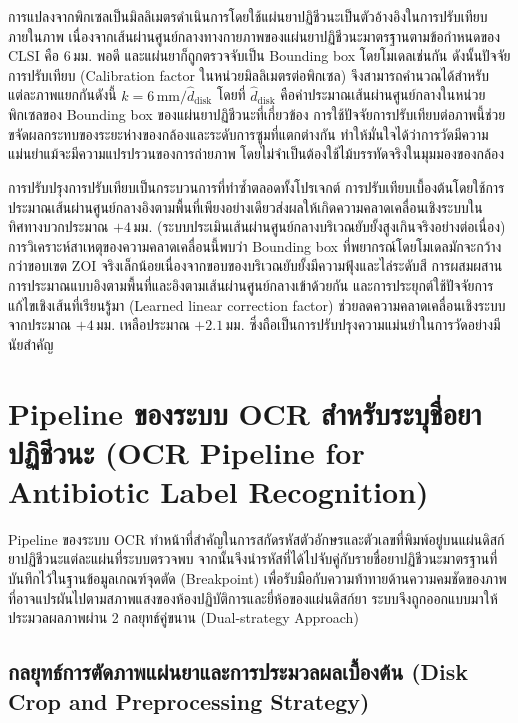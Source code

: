 การแปลงจากพิกเซลเป็นมิลลิเมตรดำเนินการโดยใช้แผ่นยาปฏิชีวนะเป็นตัวอ้างอิงในการปรับเทียบภายในภาพ เนื่องจากเส้นผ่านศูนย์กลางทางกายภาพของแผ่นยาปฏิชีวนะมาตรฐานตามข้อกำหนดของ CLSI คือ 6\,มม. พอดี และแผ่นยาก็ถูกตรวจจับเป็น Bounding box โดยโมเดลเช่นกัน ดังนั้นปัจจัยการปรับเทียบ (Calibration factor ในหน่วยมิลลิเมตรต่อพิกเซล) จึงสามารถคำนวณได้สำหรับแต่ละภาพแยกกันดังนี้ $k = 6\,\mathrm{mm} / \hat{d}_{\mathrm{disk}}$ โดยที่ $\hat{d}_{\mathrm{disk}}$ คือค่าประมาณเส้นผ่านศูนย์กลางในหน่วยพิกเซลของ Bounding box ของแผ่นยาปฏิชีวนะที่เกี่ยวข้อง การใช้ปัจจัยการปรับเทียบต่อภาพนี้ช่วยขจัดผลกระทบของระยะห่างของกล้องและระดับการซูมที่แตกต่างกัน ทำให้มั่นใจได้ว่าการวัดมีความแม่นยำแม้จะมีความแปรปรวนของการถ่ายภาพ โดยไม่จำเป็นต้องใช้ไม้บรรทัดจริงในมุมมองของกล้อง

การปรับปรุงการปรับเทียบเป็นกระบวนการที่ทำซ้ำตลอดทั้งโปรเจกต์ การปรับเทียบเบื้องต้นโดยใช้การประมาณเส้นผ่านศูนย์กลางอิงตามพื้นที่เพียงอย่างเดียวส่งผลให้เกิดความคลาดเคลื่อนเชิงระบบในทิศทางบวกประมาณ $+4$\,มม. (ระบบประเมินเส้นผ่านศูนย์กลางบริเวณยับยั้งสูงเกินจริงอย่างต่อเนื่อง) การวิเคราะห์สาเหตุของความคลาดเคลื่อนนี้พบว่า Bounding box ที่พยากรณ์โดยโมเดลมักจะกว้างกว่าขอบเขต ZOI จริงเล็กน้อยเนื่องจากขอบของบริเวณยับยั้งมีความฟุ้งและไล่ระดับสี การผสมผสานการประมาณแบบอิงตามพื้นที่และอิงตามเส้นผ่านศูนย์กลางเข้าด้วยกัน และการประยุกต์ใช้ปัจจัยการแก้ไขเชิงเส้นที่เรียนรู้มา (Learned linear correction factor) ช่วยลดความคลาดเคลื่อนเชิงระบบจากประมาณ $+4$\,มม. เหลือประมาณ $+2.1$\,มม. ซึ่งถือเป็นการปรับปรุงความแม่นยำในการวัดอย่างมีนัยสำคัญ

\section{Pipeline ของระบบ OCR สำหรับระบุชื่อยาปฏิชีวนะ (OCR Pipeline for Antibiotic Label Recognition)}

Pipeline ของระบบ OCR ทำหน้าที่สำคัญในการสกัดรหัสตัวอักษรและตัวเลขที่พิมพ์อยู่บนแผ่นดิสก์ยาปฏิชีวนะแต่ละแผ่นที่ระบบตรวจพบ จากนั้นจึงนำรหัสที่ได้ไปจับคู่กับรายชื่อยาปฏิชีวนะมาตรฐานที่บันทึกไว้ในฐานข้อมูลเกณฑ์จุดตัด (Breakpoint) เพื่อรับมือกับความท้าทายด้านความคมชัดของภาพที่อาจแปรผันไปตามสภาพแสงของห้องปฏิบัติการและยี่ห้อของแผ่นดิสก์ยา ระบบจึงถูกออกแบบมาให้ประมวลผลภาพผ่าน 2 กลยุทธ์คู่ขนาน (Dual-strategy Approach)

\subsection{กลยุทธ์การตัดภาพแผ่นยาและการประมวลผลเบื้องต้น (Disk Crop and Preprocessing Strategy)}

